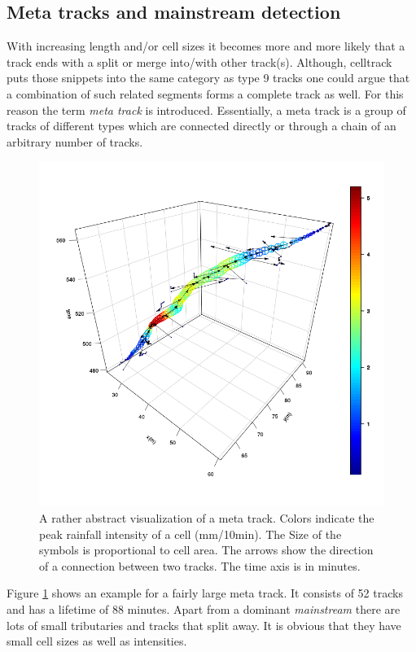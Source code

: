 \documentclass{scrartcl}
\begin{document}
\subsection{Meta tracks and mainstream detection}
\label{sec:aco}
With increasing length and/or cell sizes it becomes more and more likely that a track ends with a split or merge into/with other track(s). Although, celltrack puts those snippets into the same category as type 9 tracks one could argue that a combination of such related segments forms a complete track as well. For this reason the term \textit{meta track} is introduced. Essentially, a meta track is a group of tracks of different types which are connected directly or through a chain of an arbitrary number of tracks.
\begin{figure}[h]
	\centering
	\includegraphics[width=.8\linewidth]{scatter3D_meta_2}
	\caption{A rather abstract visualization of a meta track. Colors indicate the peak rainfall intensity of a cell (mm/10min). The Size of the symbols is proportional to cell area. The arrows show the direction of a connection between two tracks. The time axis is in minutes.}
	\label{meta_track}
\end{figure}
Figure \ref{meta_track} shows an example for a fairly large meta track. It consists of 52 tracks and has a lifetime of 88 minutes. Apart from a dominant \textit{mainstream} there are lots of small tributaries and tracks that split away. It is obvious that they have small cell sizes as well as intensities.
\end{document}
